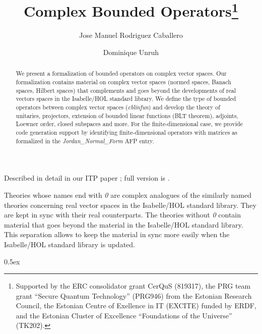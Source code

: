 \documentclass[11pt,a4paper]{article}
\begin{document}
\title{Complex Bounded Operators\thanks{Supported by the ERC consolidator grant CerQuS (819317), the PRG team grant “Secure Quantum Technology” (PRG946) from the Estonian Research Council, the Estonian Centre of Exellence in IT (EXCITE) funded by ERDF, and the Estonian Cluster of Excellence ``Foundations of the Universe'' (TK202).}}
\author[1]{Jose Manuel Rodriguez Caballero}
\author[2]{Dominique Unruh}

\maketitle

\begin{abstract}
  We present a formalization of bounded operators on complex vector spaces.
  Our formalization contains material on complex vector spaces (normed spaces, Banach spaces, Hilbert spaces)
  that complements and goes beyond the developments of real vectors spaces in the Isabelle/HOL standard library.
  We define the type of bounded operators between complex vector spaces (\textit{cblinfun}) and develop the theory of
  unitaries, projectors, extension of bounded linear functions (BLT theorem), adjoints, Loewner order, closed subspaces and more.
  For the finite-dimensional case, we provide code generation support by identifying finite-dimensional operators with matrices
  as formalized in the \textit{Jordan\_Normal\_Form} AFP entry.
\end{abstract}

Described in detail in our ITP paper \cite{bounded-operators-itp}; full version is \cite{bounded-operators-arxiv}.

\tableofcontents

Theories whose names end with \textit{0} are complex analogues of the similarly named theories concerning real vector spaces in the Isabelle/HOL standard library.
They are kept in sync with their real counterparts. The theories without \textit{0} contain material that goes beyond the material in the Isabelle/HOL standard library.
This separation allows to keep the material in sync more easily when the Isabelle/HOL standard library is updated.

\parindent 0pt\parskip 0.5ex





\end{document}
